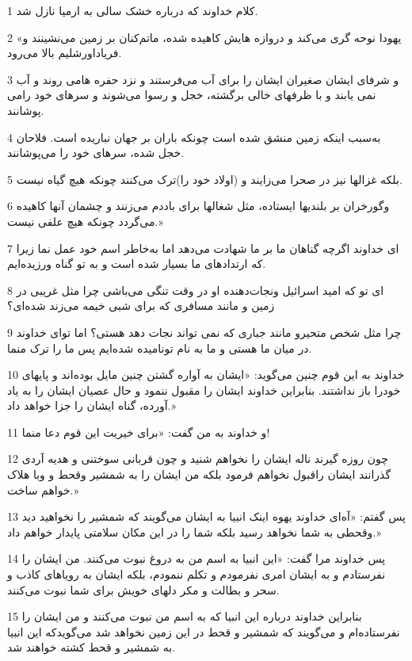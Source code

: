 \par 1 کلام خداوند که درباره خشک سالی به ارمیا نازل شد.
\par 2 «یهودا نوحه گری می‌کند و دروازه هایش کاهیده شده، ماتم‌کنان بر زمین می‌نشینند و فریاداورشلیم بالا می‌رود.
\par 3 و شرفای ایشان صغیران ایشان را برای آب می‌فرستند و نزد حفره هامی روند و آب نمی یابند و با ظرفهای خالی برگشته، خجل و رسوا می‌شوند و سرهای خود رامی پوشانند.
\par 4 به‌سبب اینکه زمین منشق شده است چونکه باران بر جهان نباریده است. فلاحان خجل شده، سرهای خود را می‌پوشانند.
\par 5 بلکه غزالها نیز در صحرا می‌زایند و (اولاد خود را)ترک می‌کنند چونکه هیچ گیاه نیست.
\par 6 وگورخران بر بلندیها ایستاده، مثل شغالها برای باددم می‌زنند و چشمان آنها کاهیده می‌گردد چونکه هیچ علفی نیست.»
\par 7 ‌ای خداوند اگر‌چه گناهان ما بر ما شهادت می‌دهد اما به‌خاطر اسم خود عمل نما زیرا که ارتدادهای ما بسیار شده است و به تو گناه ورزیده‌ایم.
\par 8 ‌ای تو که امید اسرائیل ونجات‌دهنده او در وقت تنگی می‌باشی چرا مثل غریبی در زمین و مانند مسافری که برای شبی خیمه می‌زند شده‌ای؟
\par 9 چرا مثل شخص متحیرو مانند جباری که نمی تواند نجات دهد هستی؟ اما تو‌ای خداوند در میان ما هستی و ما به نام تونامیده شده‌ایم پس ما را ترک منما.
\par 10 خداوند به این قوم چنین می‌گوید: «ایشان به آواره گشتن چنین مایل بوده‌اند و پایهای خودرا باز نداشتند. بنابراین خداوند ایشان را مقبول ننمود و حال عصیان ایشان را به یاد آورده، گناه ایشان را جزا خواهد داد.»
\par 11 و خداوند به من گفت: «برای خیریت این قوم دعا منما!
\par 12 چون روزه گیرند ناله ایشان را نخواهم شنید و چون قربانی سوختنی و هدیه آردی گذرانند ایشان راقبول نخواهم فرمود بلکه من ایشان را به شمشیر وقحط و وبا هلاک خواهم ساخت.»
\par 13 پس گفتم: «آه‌ای خداوند یهوه اینک انبیا به ایشان می‌گویند که شمشیر را نخواهید دید وقحطی به شما نخواهد رسید بلکه شما را در این مکان سلامتی پایدار خواهم داد.»
\par 14 پس خداوند مرا گفت: «این انبیا به اسم من به دروغ نبوت می‌کنند. من ایشان را نفرستادم و به ایشان امری نفرمودم و تکلم ننمودم، بلکه ایشان به رویاهای کاذب و سحر و بطالت و مکر دلهای خویش برای شما نبوت می‌کنند.
\par 15 بنابراین خداوند درباره این انبیا که به اسم من نبوت می‌کنند و من ایشان را نفرستاده‌ام و می‌گویند که شمشیر و قحط در این زمین نخواهد شد می‌گویدکه این انبیا به شمشیر و قحط کشته خواهند شد.
